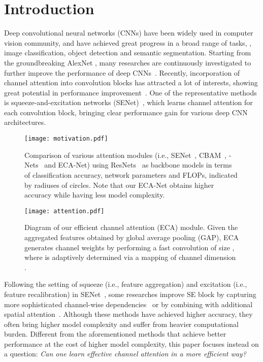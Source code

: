 \documentclass[10pt,twocolumn,letterpaper]{article}
\begin{document}
\section{Introduction}

Deep convolutional neural networks (CNNs) have been widely used in computer vision community, and have achieved great progress in a broad range of tasks, \eg, image classification, object detection and semantic segmentation. Starting from the groundbreaking AlexNet \cite{nips2012cnn}, many researches are continuously investigated to further improve the performance of deep CNNs~\cite{Simonyan15,Szegedy_2015_CVPR,He_2016_CVPR,Huang_2017_CVPR,LiXWZ17,LiYanghao_2017_ICCV,Wang_2018_CVPR}. Recently, incorporation of channel attention into convolution blocks has attracted a lot of interests, showing great potential in performance improvement~\cite{SENet18,Woo_2018_ECCV,DBLP:conf/nips/HuSASV18,A2NIPS18,Gao_2019_CVPR,DBLP-1901-01493,Fu_2019_CVPR}. One of the representative methods is squeeze-and-excitation networks (SENet)~\cite{SENet18}, which learns channel attention for each convolution block, bringing clear performance gain for various deep CNN architectures.

\begin{figure}[t]
	\centering
	\texttt{[image: motivation.pdf]}
	\caption{Comparison of various attention modules (i.e., SENet~\cite{SENet18}, CBAM~\cite{Woo_2018_ECCV},  -Nets~\cite{A2NIPS18} and ECA-Net) using ResNets~\cite{He_2016_CVPR} as backbone models in terms of classification accuracy, network parameters and FLOPs, indicated by radiuses of circles. Note that our ECA-Net obtains higher accuracy while having less model complexity.}
	\label{fig:motivation}
\end{figure}

\begin{figure}[t]
	\centering
	\texttt{[image: attention.pdf]}
	\caption{Diagram of our efficient channel attention (ECA) module. Given the aggregated features obtained by global average pooling (GAP), ECA generates channel weights by performing a fast  convolution of size , where  is adaptively determined via a mapping of channel dimension .}
	\label{fig:method}
\end{figure}

Following the setting of squeeze (i.e., feature aggregation) and excitation (i.e., feature recalibration) in SENet~\cite{SENet18}, some researches improve SE block by capturing more sophisticated channel-wise dependencies~\cite{Woo_2018_ECCV,A2NIPS18,Gao_2019_CVPR,Fu_2019_CVPR} or by combining with additional spatial attention~\cite{Woo_2018_ECCV,DBLP:conf/nips/HuSASV18,Fu_2019_CVPR}. Although these methods have achieved higher accuracy, they often bring higher model complexity and suffer from heavier computational burden. Different from the aforementioned methods that achieve better performance at the cost of higher model complexity, this paper focuses instead on a question: \emph{Can one learn effective channel attention in a more efficient way?}
\end{document}
